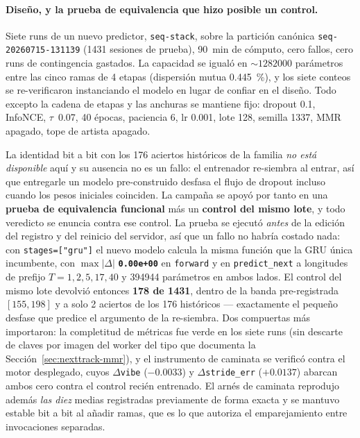 \documentclass[11pt]{article}
\newcommand{\dsid}[1]{\texttt{\small #1}}
\begin{document}
\paragraph{Diseño, y la prueba de equivalencia que hizo posible un control.} Siete
runs de un nuevo predictor, \texttt{seq-stack}, sobre la partición canónica
\dsid{seq-20260715-131139} (\num{1431} sesiones de prueba), \SI{90}{\minute} de
cómputo, cero fallos, cero runs de contingencia gastados. La capacidad se igualó en
${\sim}\num{1282000}$ parámetros entre las cinco ramas de 4 etapas (dispersión
mutua \SI{0.445}{\percent}), y los siete conteos se re-verificaron instanciando el
modelo en lugar de confiar en el diseño. Todo excepto la cadena de etapas y las
anchuras se mantiene fijo: dropout \num{0.1}, InfoNCE, $\tau$~\num{0.07},
\num{40} épocas, paciencia \num{6}, lr \num{0.001}, lote \num{128}, semilla
\num{1337}, MMR apagado, tope de artista apagado.

La identidad bit a bit con los \num{176} aciertos históricos de la familia \emph{no
está disponible} aquí y su ausencia no es un fallo: el entrenador re-siembra al
entrar, así que entregarle un modelo pre-construido desfasa el flujo de dropout
incluso cuando los pesos iniciales coinciden. La campaña se apoyó por tanto en una
\textbf{prueba de equivalencia funcional} más un \textbf{control del mismo lote}, y
todo veredicto se enuncia contra ese control. La prueba se ejecutó \emph{antes} de
la edición del registro y del reinicio del servidor, así que un fallo no habría
costado nada: con \texttt{stages=["gru"]} el nuevo modelo calcula la misma función
que la GRU única incumbente, con $\max|\Delta|$ \textbf{\texttt{0.00e+00}} en
\texttt{forward} y en \texttt{predict\_next} a longitudes de prefijo
$T=1,2,5,17,40$ y \num{394944} parámetros en ambos lados. El control del mismo lote
devolvió entonces \textbf{\num{178} de \num{1431}}, dentro de la banda
pre-registrada $[\num{155},\num{198}]$ y a solo \num{2} aciertos de los \num{176}
históricos --- exactamente el pequeño desfase que predice el argumento de la
re-siembra. Dos compuertas más importaron: la completitud de métricas fue verde en
los siete runs (sin descarte de claves por imagen del worker del tipo que documenta
la Sección~\ref{sec:nexttrack-mmr}), y el instrumento de caminata se verificó contra el
motor desplegado, cuyos $\Delta$\texttt{vibe} ($-\num{0.0033}$) y
$\Delta$\texttt{stride\_err} ($+\num{0.0137}$) abarcan ambos cero contra el control
recién entrenado. El arnés de caminata reprodujo además \emph{las diez} medias
registradas previamente de forma exacta y se mantuvo estable bit a bit al añadir
ramas, que es lo que autoriza el emparejamiento entre invocaciones separadas.
\end{document}
